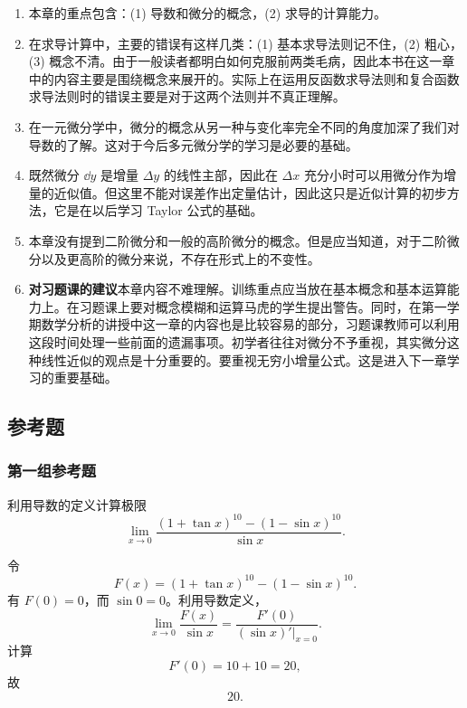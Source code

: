 \begin{enumerate}
  \item 本章的重点包含：(1) 导数和微分的概念，(2) 求导的计算能力。
  \item 在求导计算中，主要的错误有这样几类：(1) 基本求导法则记不住，(2) 粗心，(3) 概念不清。由于一般读者都明白如何克服前两类毛病，因此本书在这一章中的内容主要是围绕概念来展开的。实际上在运用反函数求导法则和复合函数求导法则时的错误主要是对于这两个法则并不真正理解。
  \item 在一元微分学中，微分的概念从另一种与变化率完全不同的角度加深了我们对导数的了解。这对于今后多元微分学的学习是必要的基础。
  \item 既然微分 $\dd y$ 是增量 $\Delta y$ 的线性主部，因此在 $\Delta x$ 充分小时可以用微分作为增量的近似值。但这里不能对误差作出定量估计，因此这只是近似计算的初步方法，它是在以后学习 Taylor 公式的基础。
  \item 本章没有提到二阶微分和一般的高阶微分的概念。但是应当知道，对于二阶微分以及更高阶的微分来说，不存在形式上的不变性。
  \item \textbf{对习题课的建议}\quad 本章内容不难理解。训练重点应当放在基本概念和基本运算能力上。在习题课上要对概念模糊和运算马虎的学生提出警告。同时，在第一学期数学分析的讲授中这一章的内容也是比较容易的部分，习题课教师可以利用这段时间处理一些前面的遗漏事项。初学者往往对微分不予重视，其实微分这种线性近似的观点是十分重要的。要重视无穷小增量公式。这是进入下一章学习的重要基础。
\end{enumerate}

\subsection{参考题}

\subsubsection*{第一组参考题}

\begin{xreferenceproblem}[1]
利用导数的定义计算极限
  \[
    \lim_{x\to0}\frac{(1+\tan x)^{10}-(1-\sin x)^{10}}{\sin x}.
  \]
\end{xreferenceproblem}
\begin{xsolution}
令
\[
  F(x)=(1+\tan x)^{10}-(1-\sin x)^{10}.
\]
有 $F(0)=0$，而 $\sin0=0$。利用导数定义，
\[
  \lim_{x\to0}\frac{F(x)}{\sin x}
  =\frac{F'(0)}{(\sin x)'\rvert_{x=0}}.
\]
计算
\[
  F'(0)=10+10=20,
\]
故
\[
  \boxed{20}.
\]
\end{xsolution}


